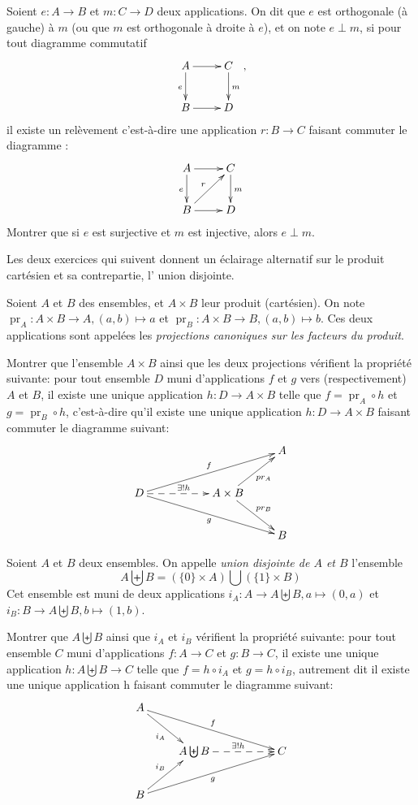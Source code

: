 \begin{exercice}
Soient $e : A\to B$ et $m : C\to D$ deux applications. On dit que $e$ est orthogonale (à gauche) à $m$ (ou que $m$ est orthogonale à droite à $e$), et on note $e\perp m$, si pour tout diagramme commutatif
\[
\xymatrix{
A \ar[r] \ar[d]_{e}& C\ar[d]^{m}\\
B \ar[r]& D 
},
\]
il existe un relèvement c'est-à-dire une application $r : B\to C$ faisant commuter le diagramme :
\[
\xymatrix{
A \ar[r] \ar[d]_{e}& C\ar[d]^{m}\\
B \ar[r]\ar[ur]^{r}& D 
}
\]
Montrer que si $e$ est surjective et $m$ est injective, alors $e\perp m$.
\end{exercice}

Les deux exercices qui suivent donnent un éclairage alternatif sur le produit cartésien et sa contrepartie, l' \og union disjointe\fg.

\begin{exercice}
Soient $A$ et $B$ des ensembles, et $ A\times B$ leur produit (cartésien). On note $\operatorname{pr}_A : A\times B \to A, (a,b)\mapsto a$ et $\operatorname{pr}_B : A\times B \to B, (a,b)\mapsto b$. Ces deux applications sont appelées les \emph{projections canoniques sur les facteurs du produit}.

Montrer que l'ensemble $A\times B$ ainsi que les deux projections vérifient la propriété suivante: pour tout ensemble $D$ muni d'applications $f$ et $g$ vers (respectivement) $A$ et $B$, il existe une unique application $h : D\to A\times B$ telle que $f =\operatorname{pr}_A \circ  h$ et $g =\operatorname{pr}_B \circ  h$, c'est-à-dire qu'il existe une unique application $h : D\to A\times B$ faisant commuter le diagramme suivant:
\[ 
\xymatrix{
& & & A\\
D \ar@{-->}[rr]^{\exists !h} \ar[urrr]^{f} \ar[drrr]_{g} & & A\times B \ar[ur]_{pr_A} \ar[dr]^{pr_B}& \\
& & & B
}\]
\end{exercice}

\begin{exercice}
Soient $A$ et $B$ deux ensembles. On appelle \emph{union disjointe de $A$ et $B$} l'ensemble
\[
A\biguplus B = (\{0\}\times A) \bigcup (\{1\}\times B)
\]
Cet ensemble est muni de deux applications $i_A : A\to A\biguplus B, a\mapsto (0,a)$ et  $i_B : B\to A\biguplus B, b\mapsto (1,b)$.

Montrer que $A\biguplus B$ ainsi que $i_A$ et $i_B$ vérifient la propriété suivante: pour tout ensemble  $C$ muni d'applications $f : A\to C$ et $g : B\to C$, il existe une unique application $h : A\biguplus B \to C$ telle que $f = h\circ i_A$ et $g = h\circ i_B$, autrement dit il existe une unique application h faisant commuter le diagramme  suivant:
\[ 
\xymatrix{
A \ar[dr]_{i_A} \ar[drrr]^{f}& & & \\
&  A\biguplus B \ar@{-->}[rr]^{\exists !h}  & & C\\
B \ar[ur]^{i_B} \ar[urrr]_{g}& & &
}\]
\end{exercice}













